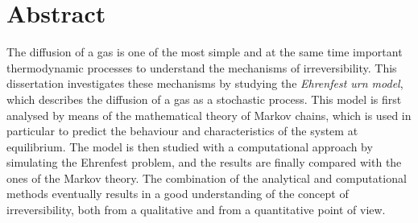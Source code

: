 \chapter*{Abstract}
The diffusion of a gas is one of the most simple and at the same time important thermodynamic processes to understand the mechanisms of irreversibility. This dissertation investigates these mechanisms by studying the \emph{Ehrenfest urn model}, which describes the diffusion of a gas as a stochastic process. This model is first analysed by means of the mathematical theory of Markov chains, which is used in particular to predict the behaviour and characteristics of the system at equilibrium. The model is then studied with a computational approach by simulating the Ehrenfest problem, and the results are finally compared with the ones of the Markov theory. The combination of the analytical and computational methods eventually results in a good understanding of the concept of irreversibility, both from a qualitative and from a quantitative point of view.